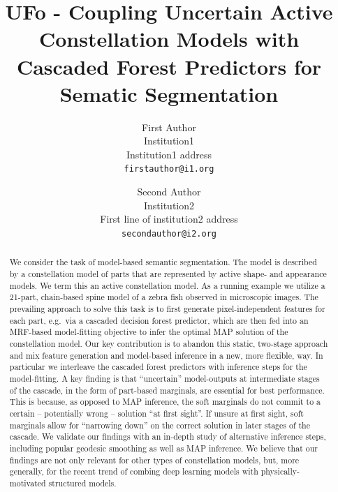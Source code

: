 \documentclass[10pt,twocolumn,letterpaper]{article}
\begin{document}
\title{UFo - Coupling Uncertain Active Constellation Models with \\
Cascaded Forest Predictors for Sematic Segmentation}

\author{First Author\\
Institution1\\
Institution1 address\\
{\tt\small firstauthor@i1.org}
\and
Second Author\\
Institution2\\
First line of institution2 address\\
{\tt\small secondauthor@i2.org}
}

\maketitle

\begin{abstract}
We consider the task of model-based semantic segmentation. The model is described by a constellation model of parts that are represented by active shape- and appearance models. We term this an active constellation model. As a running example we utilize a 21-part, chain-based spine model of a zebra fish observed in microscopic images. The prevailing approach to solve this task is to first generate pixel-independent features for each part, e.g.\ via a cascaded decision forest predictor, which are then fed into an MRF-based model-fitting objective to infer the optimal MAP solution of the constellation model. Our key contribution is to abandon this static, two-stage approach and mix feature generation and model-based inference in a new, more flexible, way. In particular we interleave the cascaded forest predictors with inference steps for the model-fitting. A key finding is that “uncertain” model-outputs at intermediate stages of the cascade, in the form of part-based marginals, are essential for best performance. 
%
This is because, as opposed to MAP inference, the soft marginals do not commit to a certain -- potentially wrong -- solution ``at first sight''. If unsure at first sight, soft marginals allow for ``narrowing down'' on the correct solution in later stages of the cascade. 
%
We validate our findings with an in-depth study of alternative inference steps, including popular geodesic smoothing as well as MAP inference. %
We believe that our findings are not only relevant for other types of constellation models, but, more generally, for the recent trend of combing deep learning models with physically-motivated structured models. 
\end{abstract}
\end{document}
